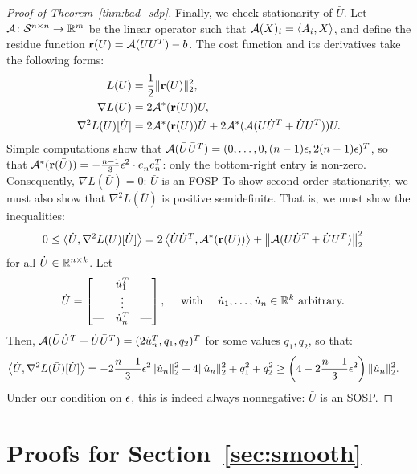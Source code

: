 \begin{proof}[Proof of Theorem~\ref{thm:bad_sdp}]
	Finally, we check stationarity of $\bar U$. Let $\mathcal{A} \colon \mathcal{S}^{n\times n} \to \mathbb{R}^m$ be the linear operator such that $\mathcal{A}(X)_i = \left\langle A_i, X \right\rangle$, and define the residue function $\mathbf{r}(U) = \mathcal{A}(UU^T) - b$. The cost function and its derivatives take the following forms:
	\begin{align*}
		L(U) & = \frac{1}{2} \|\mathbf{r}(U)\|_2^2, \\
		\nabla L(U) & = 2\mathcal{A}^*(\mathbf{r}(U))U, \\
		\nabla^2 L(U)[\dot U] & = 2\mathcal{A}^*(\mathbf{r}(U))\dot U + 2\mathcal{A}^*(\mathcal{A}(U\dot U^T + \dot U U^T))U.
	\end{align*}
	Simple computations show that $\mathcal{A}(\bar U \bar U^T) = (0, \ldots, 0, (n-1)\epsilon, 2(n-1)\epsilon)^T$, so that $\mathcal{A}^*(\mathbf{r}(\bar U)) = -\frac{n-1}{3} \epsilon^2 \cdot e_n^{} e_n^T$: only the bottom-right entry is non-zero. Consequently, $\nabla L(\bar U) = 0$: $\bar U$ is an FOSP To show second-order stationarity, we must also show that $\nabla^2 L(\bar U)$ is positive semidefinite.
	That is, we must show the inequalities:
	\begin{align*}
		0 \leq \left\langle \dot U, \nabla^2 L(U)[\dot U] \right\rangle & = 2\left\langle \dot U \dot U^T, \mathcal{A}^*(\mathbf{r}(U)) \right\rangle + \left\|\mathcal{A}(U \dot U^T + \dot U U^T)\right\|_2^2
	\end{align*}
	for all $\dot U \in \mathbb{R}^{n\times k}$. Let
	\begin{align*}
		\dot U & = \begin{bmatrix}
			\textrm{---} &\dot u_1^T & \textrm{---} \\ & \vdots&  \\ \textrm{---} &\dot u_n^T& \textrm{---}
		\end{bmatrix}, \quad \textrm{ with } \quad \dot u_1, \ldots, \dot u_n \in \mathbb{R}^{k} \textrm{ arbitrary.}
	\end{align*}
	Then, $\mathcal{A}(\bar U\dot U^T + \dot U\bar U^T) = (2\dot u_n^T, q_1, q_2)^T$ for some values $q_1, q_2$, so that:
	\begin{align*}
		\left\langle \dot U, \nabla^2 L(\bar U)[\dot U] \right\rangle & = -2\frac{n-1}{3} \epsilon^2 \|\dot u_n\|_2^2 + 4 \|\dot u_n\|_2^2 + q_1^2 + q_2^2 \geq \left(4-2\frac{n-1}{3} \epsilon^2 \right) \|\dot u_n\|_2^2.
	\end{align*}
	Under our condition on $\epsilon$, this is indeed always nonnegative: $\bar U$ is an SOSP.
\end{proof}

\section{Proofs for Section~\ref{sec:smooth}}\label{app:smooth}

